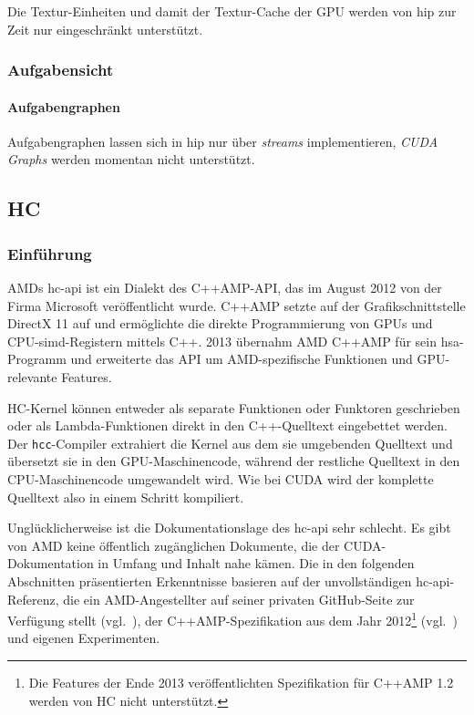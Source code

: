 Die Textur-Einheiten und damit der Textur-Cache der GPU werden von \gls{hip} zur
Zeit nur eingeschränkt unterstützt.

\subsubsection{Aufgabensicht}

\paragraph{Aufgabengraphen}

Aufgabengraphen lassen sich in \gls{hip} nur über \textit{streams}
implementieren, \textit{CUDA Graphs} werden momentan nicht unterstützt.

\subsection{HC}
\label{vergleich:hc}

\subsubsection{Einführung}

AMDs \gls{hc}-\gls{api} ist ein Dialekt des C++AMP-API, das im August 2012 von
der Firma Microsoft veröffentlicht wurde. C++AMP setzte auf der
Grafikschnittstelle DirectX 11 auf und ermöglichte die direkte Programmierung
von GPUs und CPU-\gls{simd}-Registern mittels C++. 2013 übernahm AMD C++AMP
für sein \gls{hsa}-Programm und erweiterte das API um AMD-spezifische Funktionen
und GPU-relevante Features.

HC-Kernel können entweder als separate Funktionen oder Funktoren geschrieben 
oder als Lambda-Funktionen direkt in den C++-Quelltext eingebettet werden. Der
\texttt{hcc}-Compiler extrahiert die Kernel aus dem sie umgebenden Quelltext
und übersetzt sie in den GPU-Maschinencode, während der restliche Quelltext
in den CPU-Maschinencode umgewandelt wird. Wie bei CUDA wird der komplette
Quelltext also in einem Schritt kompiliert.

Unglücklicherweise ist die Dokumentationslage des \gls{hc}-\gls{api} sehr
schlecht. Es gibt von AMD keine öffentlich zugänglichen Dokumente, die der
CUDA-Dokumentation in Umfang und Inhalt nahe kämen. Die in den folgenden
Abschnitten präsentierten Erkenntnisse basieren auf der unvollständigen
\gls{hc}-\gls{api}-Referenz, die ein AMD-Angestellter auf seiner privaten
GitHub-Seite zur Verfügung stellt (vgl.~\cite{hcref}), der C++AMP-Spezifikation aus
dem Jahr 2012\footnote{Die Features der Ende 2013 veröffentlichten Spezifikation
für C++AMP 1.2 werden von HC nicht unterstützt.} (vgl.~\cite{cppamp2012}) und
eigenen Experimenten.

